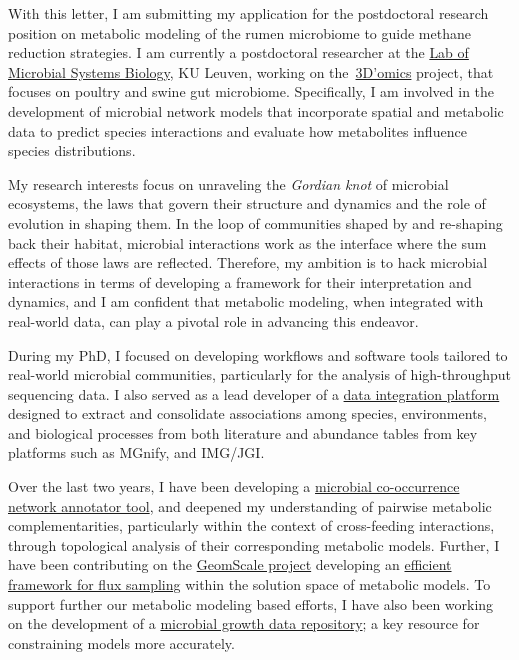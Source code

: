 With this letter, I am submitting my application for the 
postdoctoral research position on metabolic modeling of the rumen microbiome to guide methane reduction strategies.
I am currently a 
postdoctoral researcher at the \href{http://www.msysbiology.com/}{Lab of Microbial Systems Biology}, KU Leuven, working on the~\href{https://www.3domics.eu/}{3D'omics} project, that focuses on poultry and swine gut microbiome. 
Specifically, I am involved in the development of microbial network models that incorporate spatial and metabolic data to predict species interactions and evaluate how metabolites influence species distributions.

My research interests focus on unraveling the \textit{Gordian knot} of microbial ecosystems,
the laws that govern their structure and dynamics and the role of evolution in shaping them. 
In the loop of communities shaped by and re-shaping back their habitat, microbial interactions work as the interface where the sum effects of those laws are reflected. 
Therefore, my ambition is to hack microbial interactions in terms of developing a framework for their interpretation and dynamics, and I am confident that metabolic modeling, when integrated with real-world data, can play a pivotal role in advancing this endeavor.

During my PhD, I focused on developing workflows and software tools tailored to real-world microbial communities, particularly for the analysis of high-throughput sequencing data. 
I also served as a lead developer of a \href{https://prego.hcmr.gr/}{data integration platform} designed to extract and consolidate associations among species, environments, and biological processes from both literature and abundance tables from key platforms such as MGnify, and IMG/JGI.

Over the last two years, I have been developing a \href{https://microbetag.readthedocs.io/}{microbial co-occurrence network annotator tool}, and deepened my understanding of pairwise metabolic complementarities, particularly within the context of cross-feeding interactions, through topological analysis of their corresponding metabolic models. 
Further, I have been contributing on the \href{https://geomscale.github.io/}{GeomScale project}
developing an \href{https://github.com/geomScale/dingo}{efficient framework for flux sampling} within the solution space of metabolic models.
To support further our metabolic modeling based efforts, I have also been working on 
the development of a \href{https://mgrowthdb.gbiomed.kuleuven.be/}{microbial growth data repository}; a key resource for constraining models more accurately. 


